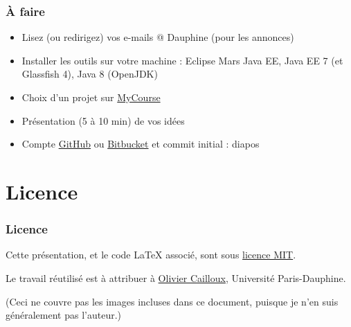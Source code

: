 \documentclass[english, french]{beamer}
\begin{document}
\begin{frame}
	\frametitle{À faire}
	\begin{itemize}
		\item Lisez (ou redirigez) vos e-mails @ Dauphine (pour les annonces)
		\item Installer les outils sur votre machine : Eclipse Mars Java EE, Java EE 7 (et Glassfish 4), Java 8 (OpenJDK)
		\item Choix d’un projet sur \href{https://mycourse.dauphine.fr/webapps/blackboard/execute/courseMain?course_id=_34753_1}{MyCourse}
		\item Présentation (5 à 10 min) de vos idées
		\item Compte \href{https://github.com/}{GitHub} ou \href{https://bitbucket.org/}{Bitbucket} et commit initial : diapos
	\end{itemize}
\end{frame}

\appendix
\AtBeginSection{
}
\section{Licence}
\begin{frame}
	\frametitle{Licence}
	Cette présentation, et le code LaTeX associé, sont sous \href{http://opensource.org/licenses/MIT}{licence MIT}.
	
	Le travail réutilisé est à attribuer à \href{http://www.lamsade.dauphine.fr/~ocailloux/}{Olivier Cailloux}, Université Paris-Dauphine.
	
	\small{(Ceci ne couvre pas les images incluses dans ce document, puisque je n’en suis généralement pas l’auteur.)}
\end{frame}
\end{document}
